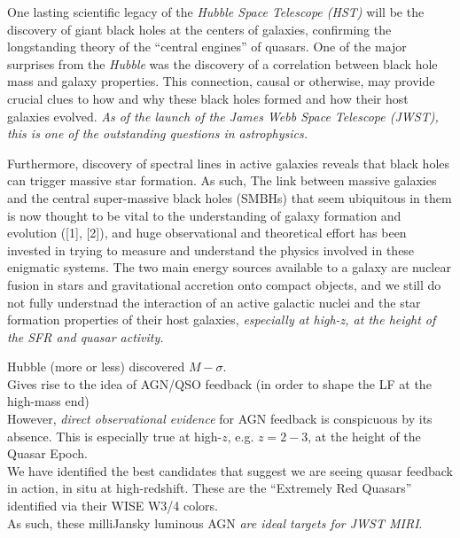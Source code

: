 

One lasting scientific legacy of the {\it Hubble Space Telescope
(HST)} will be the discovery of giant black holes at the centers of
galaxies, confirming the longstanding theory of the ``central
engines'' of quasars. One of the major surprises from the {\it Hubble}
was the discovery of a correlation between black hole mass and galaxy
properties.  This connection, causal or otherwise, may provide crucial
clues to how and why these black holes formed and how their host
galaxies evolved. {\it As of the launch of the James Webb Space
Telescope (JWST), this is one of the outstanding questions in
astrophysics.}

Furthermore, discovery of spectral lines in active galaxies reveals that black holes can trigger massive star formation. 
As such, %
The link between massive galaxies and the central super-massive black holes (SMBHs) that seem ubiquitous in them is now thought to be vital to the understanding of galaxy formation and evolution ([1], [2]), and huge observational and theoretical effort has been invested in trying to measure and understand the physics involved in these enigmatic systems.
The two main energy sources available to a galaxy are nuclear fusion in stars and gravitational accretion onto compact objects, and we still do not fully understnad the interaction of an active galactic nuclei and the star formation properties of their host galaxies, {\it especially at high-z, at the height of the SFR and quasar activity.} 


\smallskip
\smallskip
\noindent
Hubble (more or less) discovered $M-\sigma$. \\
Gives rise to the idea of AGN/QSO feedback (in order to shape the LF at the high-mass end)\\
However, {\it direct observational evidence} for AGN feedback is conspicuous by its absence. This is especially true at high-$z$, e.g. $z=2-3$, at the height of the Quasar Epoch. \\
We have identified the best candidates that suggest we are seeing quasar feedback in action, in situ at high-redshift. These are the ``Extremely Red Quasars'' identified via their WISE W3/4 colors. \\
As such, these milliJansky luminous AGN {\it are ideal targets for JWST MIRI}. 


